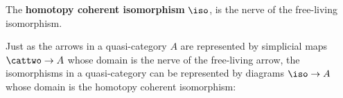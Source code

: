 


  \begin{definition}\label{defn:coherent-isomorphism}
    \leanok
    The \textbf{homotopy coherent isomorphism} $\iso$, is the nerve of the free-living isomorphism.
  \end{definition}

  Just as the arrows in a quasi-category $A$ are represented by simplicial maps $ \cattwo \to A$ whose domain is the nerve of the free-living arrow, the isomorphisms in a quasi-category can be represented by diagrams $\iso \to A$ whose domain is the homotopy coherent isomorphism:

